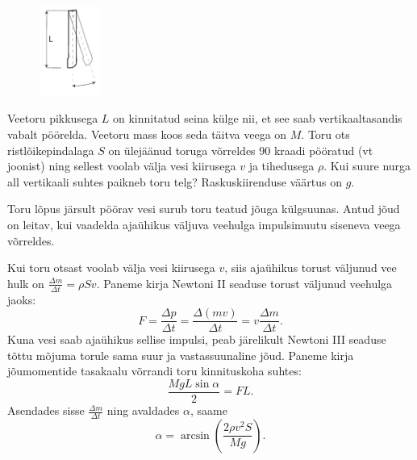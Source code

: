 
\begin{figure}
 \vspace{-30pt}
 \begin{center}
 \includegraphics[width=0.18\textwidth]{2015-v2g-05-toru}
 \end{center}
\end{figure}
Veetoru pikkusega $L$ on kinnitatud seina külge nii, et see saab vertikaaltasandis vabalt pöörelda. Veetoru mass koos seda täitva veega on $M$. Toru ots ristlõikepindalaga $S$ on ülejäänud toruga võrreldes \num{90} kraadi pööratud (vt joonist) ning sellest voolab välja vesi kiirusega $v$ ja tihedusega $\rho$. Kui suure nurga all vertikaali suhtes paikneb toru telg? Raskuskiirenduse väärtus on $g$.

\hint
Toru lõpus järsult pöörav vesi surub toru teatud jõuga külgsuunas. Antud jõud on leitav, kui vaadelda ajaühikus väljuva veehulga impulsimuutu siseneva veega võrreldes.

\solu
Kui toru otsast voolab välja vesi kiirusega $v$, siis ajaühikus torust väljunud vee hulk on $\frac{\Delta m}{\Delta t}=\rho S v$. Paneme kirja Newtoni II seaduse torust väljunud veehulga jaoks: 
\[ F=\frac{\Delta p}{\Delta t}=\frac{\Delta(mv)}{\Delta t}=v \frac{\Delta m}{\Delta t}. \]
Kuna vesi saab ajaühikus sellise impulsi, peab järelikult Newtoni III seaduse tõttu mõjuma torule sama suur ja vastassuunaline jõud. Paneme kirja jõumomentide tasakaalu võrrandi toru kinnituskoha suhtes: 
\[ \frac{MgL\sin \alpha}{2}=FL. \]
Asendades sisse $\frac{\Delta m}{\Delta t}$ ning avaldades $\alpha$, saame
\[ \alpha=\arcsin \left(\frac{2\rho v^2 S}{Mg}\right). \]

